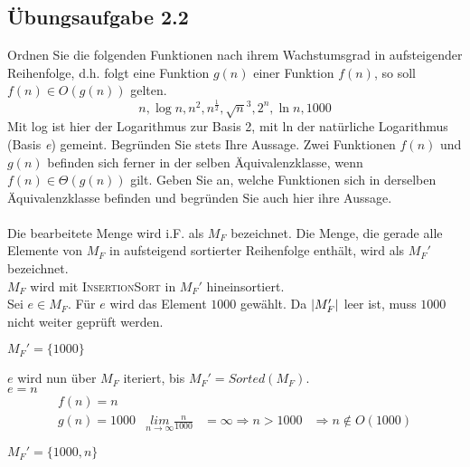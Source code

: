 \documentclass{article}
\begin{document}
\subsection{Übungsaufgabe 2.2}
\begin{flushright}
\begin{Large}
[~~~~\string| ~~4~]
\end{Large}
\end{flushright}
Ordnen Sie die folgenden Funktionen nach ihrem Wachstumsgrad in aufsteigender Reihenfolge, d.h. folgt eine Funktion $g(n)$ einer Funktion $f(n)$, so soll $f(n) \in O(g(n))$ gelten.
\[
	n, \operatorname{log} n, n^2, n^{\frac{1}{2}}, \sqrt{n}^3, 2^n, \operatorname{ln} n, 1000
\]
Mit log ist hier der Logarithmus zur Basis 2, mit ln der natürliche Logarithmus (Basis \textit{e}) gemeint.
Begründen Sie stets Ihre Aussage.
Zwei Funktionen $f(n)$ und $g(n)$ befinden sich ferner in der selben Äquivalenzklasse, wenn $f(n) \in \Theta (g(n))$ gilt.
Geben Sie an, welche Funktionen sich in derselben Äquivalenzklasse befinden und begründen Sie auch hier ihre Aussage.\\
\vspace{1cm}\\
Die bearbeitete Menge wird i.F. als $M_F$ bezeichnet.
Die Menge, die gerade alle Elemente von $M_F$ in aufsteigend sortierter Reihenfolge enthält, wird als $M_F'$ bezeichnet.\\
$M_F$ wird mit \textsc{InsertionSort} in $M_F'$ hineinsortiert.\\ \vspace{0.5cm}
Sei $e \in M_F$.
Für $e$ wird das Element $1000$ gewählt.
Da $\string|M_F'\string|$ leer ist, muss $1000$ nicht weiter geprüft werden.
\begin{flushright}
	$M_F' = \{1000\}$
\end{flushright}
$e$ wird nun über $M_F$ iteriert, bis $M_F' = Sorted(M_F)$. \vspace{0.5cm}\\
$e = n$
\begin{equation*}
	\begin{array}{llll}
		f(n) = n	\\
		g(n) = 1000	&	\underset{n\rightarrow\infty}{lim}	\frac{n}{1000}	&=	\infty	\Rightarrow n > 1000 &\Rightarrow n \not \in O(1000)
	\end{array}
\end{equation*}
\begin{flushright}
	$M_F' = \{1000,n\}$
\end{flushright}
\end{document}
